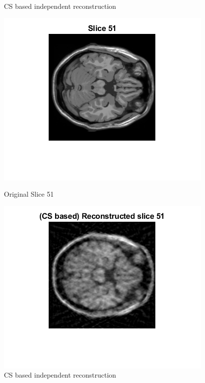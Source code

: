 \documentclass[12pt]{article}
\begin{document}
\begin{enumerate}[label = (\alph*)]
\begin{figure}[H]
\begin{minipage}{.45\textwidth}
            \caption*{CS based independent reconstruction}
        \end{minipage}
    \end{figure}
    \begin{figure}[H]
        \centering
        \begin{minipage}{.45\textwidth}
            \centering
            \includegraphics[width=\linewidth]{Images/Q3_51.png}
            \caption*{Original Slice 51}
        \end{minipage}
        \begin{minipage}{.45\textwidth}
            \centering
            \includegraphics[width=\linewidth]{Images/Q3_Extra_51_b.png}
            \caption*{CS based independent reconstruction}
        \end{minipage}
    \end{figure}


\end{enumerate}
\end{document}
